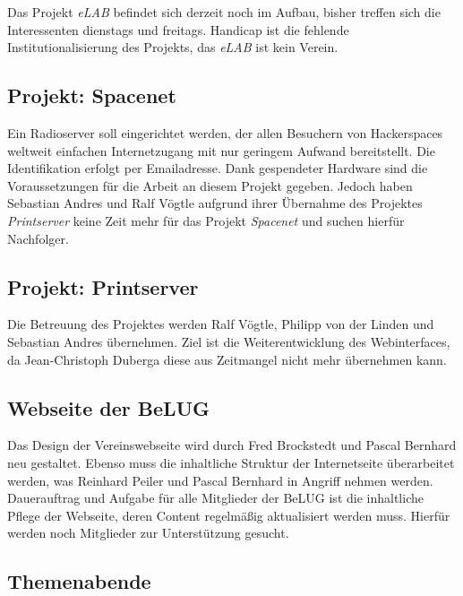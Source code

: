 \documentclass[11pt,a4paper,ngerman]{article}
\begin{document}
Das Projekt \emph{eLAB} befindet sich derzeit noch im Aufbau, bisher treffen 
sich die Interessenten dienstags und freitags. Handicap ist die fehlende 
Institutionalisierung des Projekts, das \emph{eLAB} ist kein Verein.


  \subsection{Projekt: Spacenet}

Ein Radioserver soll eingerichtet werden, der allen Besuchern von Hackerspaces 
weltweit einfachen Internetzugang mit nur geringem Aufwand bereitstellt. Die 
Identifikation erfolgt per Emailadresse. Dank gespendeter Hardware sind die 
Voraussetzungen für die Arbeit an diesem Projekt gegeben. Jedoch haben 
Sebastian Andres und Ralf Vögtle aufgrund ihrer Übernahme des Projektes 
\emph{Printserver} keine Zeit mehr für das Projekt \emph{Spacenet} und suchen 
hierfür Nachfolger.



  \subsection{Projekt: Printserver}

Die Betreuung des Projektes werden Ralf Vögtle, Philipp von der Linden und 
Sebastian Andres übernehmen. Ziel ist die Weiterentwicklung des Webinterfaces, 
da Jean-Christoph Duberga diese aus Zeitmangel nicht mehr übernehmen kann.  
  
  
  
  \subsection{Webseite der BeLUG}
  
Das Design der Vereinswebseite wird durch Fred Brockstedt und Pascal Bernhard 
neu gestaltet. Ebenso muss die inhaltliche Struktur der Internetseite 
überarbeitet werden, was Reinhard Peiler und Pascal Bernhard in Angriff nehmen 
werden. Dauerauftrag und Aufgabe für alle Mitglieder der BeLUG ist die 
inhaltliche Pflege der Webseite, deren Content regelmäßig aktualisiert werden 
muss. Hierfür werden noch Mitglieder zur Unterstützung gesucht. 
  
  

  \subsection{Themenabende}
\end{document}
